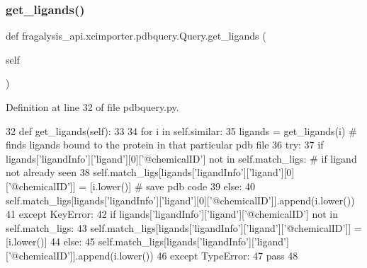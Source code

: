 \subsubsection{\texorpdfstring{get\+\_\+ligands()}{get\_ligands()}}
{\footnotesize\ttfamily def fragalysis\+\_\+api.\+xcimporter.\+pdbquery.\+Query.\+get\+\_\+ligands (\begin{DoxyParamCaption}\item[{}]{self }\end{DoxyParamCaption})}



Definition at line 32 of file pdbquery.\+py.


\begin{DoxyCode}
32     \textcolor{keyword}{def }get\_ligands(self):
33 
34         \textcolor{keywordflow}{for} i \textcolor{keywordflow}{in} self.similar:
35             ligands = get\_ligands(i)  \textcolor{comment}{# finds ligands bound to the protein in that particular pdb file}
36             \textcolor{keywordflow}{try}:
37                 \textcolor{keywordflow}{if} ligands[\textcolor{stringliteral}{'ligandInfo'}][\textcolor{stringliteral}{'ligand'}][0][\textcolor{stringliteral}{'@chemicalID'}] \textcolor{keywordflow}{not} \textcolor{keywordflow}{in} self.match\_ligs:  \textcolor{comment}{# if ligand
       not already seen}
38                     self.match\_ligs[ligands[\textcolor{stringliteral}{'ligandInfo'}][\textcolor{stringliteral}{'ligand'}][0][\textcolor{stringliteral}{'@chemicalID'}]] = [i.lower()]   \textcolor{comment}{#
       save pdb code}
39                 \textcolor{keywordflow}{else}:
40                     self.match\_ligs[ligands[\textcolor{stringliteral}{'ligandInfo'}][\textcolor{stringliteral}{'ligand'}][0][\textcolor{stringliteral}{'@chemicalID'}]].append(i.lower())
41             \textcolor{keywordflow}{except} KeyError:
42                 \textcolor{keywordflow}{if} ligands[\textcolor{stringliteral}{'ligandInfo'}][\textcolor{stringliteral}{'ligand'}][\textcolor{stringliteral}{'@chemicalID'}] \textcolor{keywordflow}{not} \textcolor{keywordflow}{in} self.match\_ligs:
43                     self.match\_ligs[ligands[\textcolor{stringliteral}{'ligandInfo'}][\textcolor{stringliteral}{'ligand'}][\textcolor{stringliteral}{'@chemicalID'}]] = [i.lower()]
44                 \textcolor{keywordflow}{else}:
45                     self.match\_ligs[ligands[\textcolor{stringliteral}{'ligandInfo'}][\textcolor{stringliteral}{'ligand'}][\textcolor{stringliteral}{'@chemicalID'}]].append(i.lower())
46             \textcolor{keywordflow}{except} TypeError:
47                 \textcolor{keywordflow}{pass}
48 
\end{DoxyCode}
\mbox{\label{classfragalysis__api_1_1xcimporter_1_1pdbquery_1_1_query_a0beef45de2126a3837b02050e1b90a74}} 
